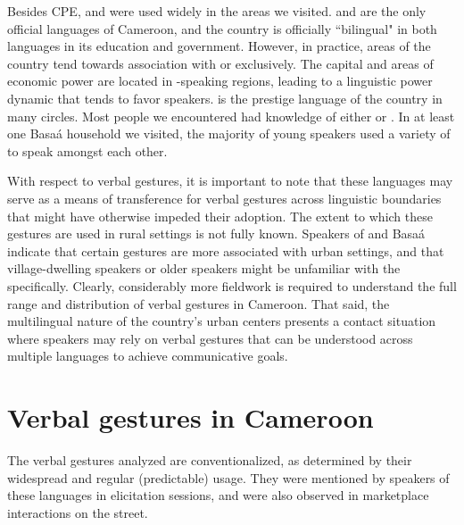 \documentclass[output=paper,newtxmath,modfonts,nonflat,hidelinks]{langsci/langscibook}
\begin{document}
Besides CPE,  and  were used widely in the areas we visited.   and  are the only official languages of Cameroon, and the country is officially ``bilingual" in both languages in its education and government. However, in practice, areas of the country tend towards association with  or  exclusively. The capital and areas of economic power are located in -speaking regions, leading to a linguistic power dynamic that tends to favor  speakers.  is the prestige language of the country in many circles. Most people we encountered had knowledge of either  or . In at least one Basa\'a household we visited, the majority of young speakers used a variety of  to speak amongst each other. 

With respect to verbal gestures, it is important to note that these languages may serve as a means of transference for verbal gestures across linguistic boundaries that might have otherwise impeded their adoption. The extent to which these gestures are used in rural settings is not fully known. Speakers of  and Basa\'a indicate that certain gestures are more associated with urban settings, and that village-dwelling speakers or older speakers might be unfamiliar with the  specifically.  Clearly, considerably more fieldwork is required to understand the full range and distribution of verbal gestures in Cameroon. That said, the multilingual nature of the country's urban centers presents a  contact situation where speakers may rely on verbal gestures that can be understood across multiple languages to achieve communicative goals.


\section{Verbal gestures in Cameroon}\label{sec:pillion:vg}

\sloppy
The verbal gestures analyzed are conventionalized, as determined by their wide\-spread and regular (predictable) usage. They were mentioned by speakers of these languages in elicitation sessions, and were also observed in marketplace interactions on the street. 
\fussy 

\noindent
\end{document}
